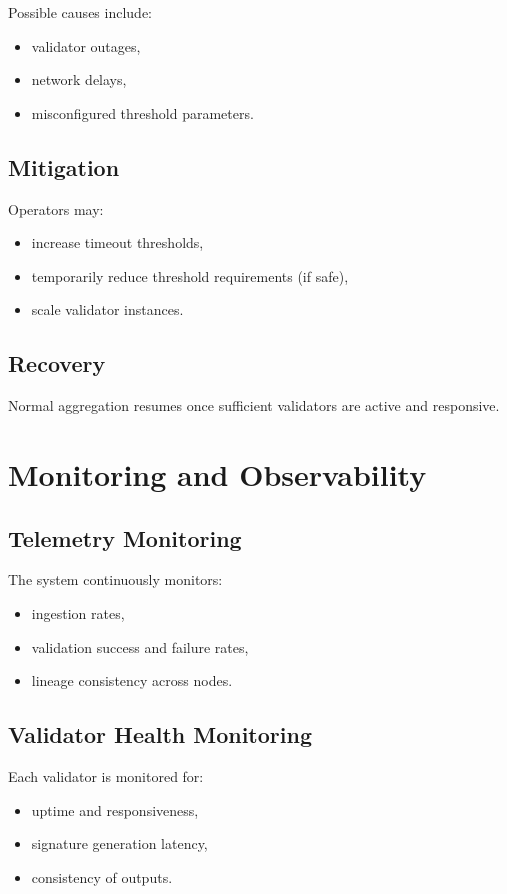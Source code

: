 Possible causes include:
\begin{itemize}
\item validator outages,
\item network delays,
\item misconfigured threshold parameters.
\end{itemize}

\subsection{Mitigation}

Operators may:
\begin{itemize}
\item increase timeout thresholds,
\item temporarily reduce threshold requirements (if safe),
\item scale validator instances.
\end{itemize}

\subsection{Recovery}

Normal aggregation resumes once sufficient validators are active and responsive.

\section{Monitoring and Observability}

\subsection{Telemetry Monitoring}

The system continuously monitors:
\begin{itemize}
\item ingestion rates,
\item validation success and failure rates,
\item lineage consistency across nodes.
\end{itemize}

\subsection{Validator Health Monitoring}

Each validator is monitored for:
\begin{itemize}
\item uptime and responsiveness,
\item signature generation latency,
\item consistency of outputs.
\end{itemize}

